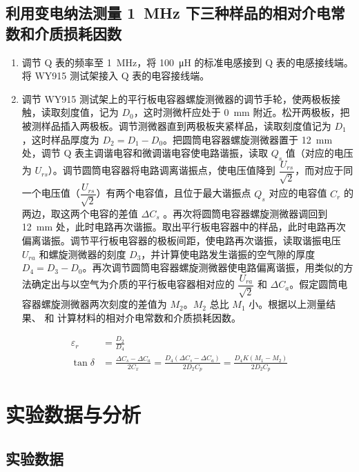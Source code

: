 \documentclass[a4paper,utf8]{article}
\begin{document}
    \subsection{利用变电纳法测量 \SI{1}{\mega\hertz} 下三种样品的相对介电常数和介质损耗因数}
        \begin{enumerate}
            \item 调节 Q 表的频率至 \SI{1}{\mega\hertz}，将 \SI{100}{\micro\henry} 的标准电感接到 Q 表的电感接线端。将 WY915 测试架接入 Q 表的电容接线端。
            \item 调节 WY915 测试架上的平行板电容器螺旋测微器的调节手轮，使两极板接触，读取刻度值，记为 $D_0$，这时测微杆应处于 \SI{0}{\milli\metre} 附近。松开两极板，把被测样品插入两极板。调节测微器直到两极板夹紧样品，读取刻度值记为 $D_1$，这时样品厚度为 $D_2 = D_1 - D_0$。把圆筒电容器螺旋测微器置于 \SI{12}{\milli\metre} 处，调节 Q 表主调谐电容和微调谐电容使电路谐振，读取 $Q_s$ 值（对应的电压为 $U_{rs}$）。调节圆筒电容器将电路调离谐振点，使电压值降到 $\dfrac{U_{rs}}{\sqrt{2}}$，而对应于同一个电压值（$\dfrac{U_{rs}}{\sqrt{2}}$）有两个电容值，且位于最大谐振点 $Q_s$ 对应的电容值 $C_r$ 的两边，取这两个电容的差值 $\varDelta C_s$ 。再次将圆筒电容器螺旋测微器调回到 \SI{12}{\milli\metre} 处，此时电路再次谐振。取出平行板电容器中的样品，此时电路再次偏离谐振。调节平行板电容器的极板间距，使电路再次谐振，读取谐振电压 $U_{ra}$ 和螺旋测微器的刻度 $D_3$，并计算使电路发生谐振的空气隙的厚度 $D_4=D_3-D_0$。再次调节圆筒电容器螺旋测微器使电路偏离谐振，用类似的方法确定出与以空气为介质的平行板电容器相对应的 $\dfrac{U_{ra}}{\sqrt{2}}$ 和 $\varDelta C_a$。假定圆筒电容器螺旋测微器两次刻度的差值为 $M_2$。$M_2$ 总比 $M_1$ 小。根据以上测量结果、 和 计算材料的相对介电常数和介质损耗因数。
        \end{enumerate}
        \begin{align}
            \varepsilon_r&=\frac{D_2}{D_4}\label{eq23}\\
            \tan\delta&=\frac{\Delta C_{s}-\Delta C_{a}}{2C_{x}}=\frac{D_{4}(\Delta C_{s}-\Delta C_{a})}{2D_{2}C_{p}}=\frac{D_{4}K(M_{1}-M_{2})}{2D_{2}C_{p}}\label{eq24}
        \end{align}
    \pagebreak
\section{实验数据与分析}
\subsection{实验数据}

\end{document}
